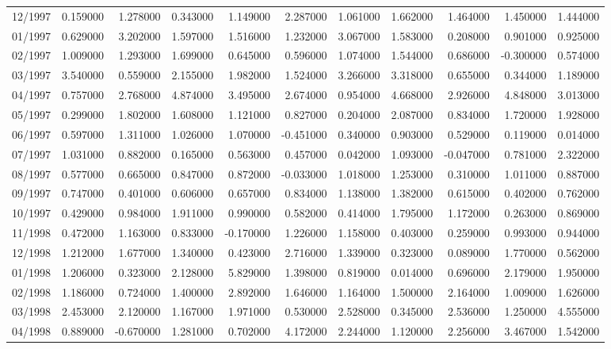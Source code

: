 \begin{tabular}{lrrrrrrrrrr}
12/1997 & 0.159000 & 1.278000 & 0.343000 & 1.149000 & 2.287000 & 1.061000 & 1.662000 & 1.464000 & 1.450000 & 1.444000 \\
01/1997 & 0.629000 & 3.202000 & 1.597000 & 1.516000 & 1.232000 & 3.067000 & 1.583000 & 0.208000 & 0.901000 & 0.925000 \\
02/1997 & 1.009000 & 1.293000 & 1.699000 & 0.645000 & 0.596000 & 1.074000 & 1.544000 & 0.686000 & -0.300000 & 0.574000 \\
03/1997 & 3.540000 & 0.559000 & 2.155000 & 1.982000 & 1.524000 & 3.266000 & 3.318000 & 0.655000 & 0.344000 & 1.189000 \\
04/1997 & 0.757000 & 2.768000 & 4.874000 & 3.495000 & 2.674000 & 0.954000 & 4.668000 & 2.926000 & 4.848000 & 3.013000 \\
05/1997 & 0.299000 & 1.802000 & 1.608000 & 1.121000 & 0.827000 & 0.204000 & 2.087000 & 0.834000 & 1.720000 & 1.928000 \\
06/1997 & 0.597000 & 1.311000 & 1.026000 & 1.070000 & -0.451000 & 0.340000 & 0.903000 & 0.529000 & 0.119000 & 0.014000 \\
07/1997 & 1.031000 & 0.882000 & 0.165000 & 0.563000 & 0.457000 & 0.042000 & 1.093000 & -0.047000 & 0.781000 & 2.322000 \\
08/1997 & 0.577000 & 0.665000 & 0.847000 & 0.872000 & -0.033000 & 1.018000 & 1.253000 & 0.310000 & 1.011000 & 0.887000 \\
09/1997 & 0.747000 & 0.401000 & 0.606000 & 0.657000 & 0.834000 & 1.138000 & 1.382000 & 0.615000 & 0.402000 & 0.762000 \\
10/1997 & 0.429000 & 0.984000 & 1.911000 & 0.990000 & 0.582000 & 0.414000 & 1.795000 & 1.172000 & 0.263000 & 0.869000 \\
11/1998 & 0.472000 & 1.163000 & 0.833000 & -0.170000 & 1.226000 & 1.158000 & 0.403000 & 0.259000 & 0.993000 & 0.944000 \\
12/1998 & 1.212000 & 1.677000 & 1.340000 & 0.423000 & 2.716000 & 1.339000 & 0.323000 & 0.089000 & 1.770000 & 0.562000 \\
01/1998 & 1.206000 & 0.323000 & 2.128000 & 5.829000 & 1.398000 & 0.819000 & 0.014000 & 0.696000 & 2.179000 & 1.950000 \\
02/1998 & 1.186000 & 0.724000 & 1.400000 & 2.892000 & 1.646000 & 1.164000 & 1.500000 & 2.164000 & 1.009000 & 1.626000 \\
03/1998 & 2.453000 & 2.120000 & 1.167000 & 1.971000 & 0.530000 & 2.528000 & 0.345000 & 2.536000 & 1.250000 & 4.555000 \\
04/1998 & 0.889000 & -0.670000 & 1.281000 & 0.702000 & 4.172000 & 2.244000 & 1.120000 & 2.256000 & 3.467000 & 1.542000 \\

\end{tabular}
